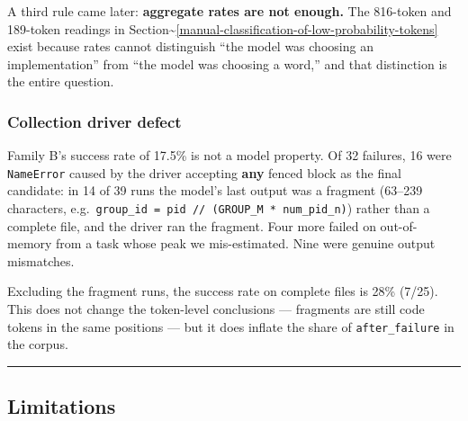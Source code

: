 \documentclass[
  11pt,
]{article}
\begin{document}
A third rule came later: \textbf{aggregate rates are not enough.} The
816-token and 189-token readings in
Section\textasciitilde{}\ref{manual-classification-of-low-probability-tokens}
exist because rates cannot distinguish ``the model was choosing an
implementation'' from ``the model was choosing a word,'' and that
distinction is the entire question.

\hypertarget{collection-driver-defect}{%
\subsubsection{Collection driver
defect}\label{collection-driver-defect}}

Family B's success rate of 17.5\% is not a model property. Of 32
failures, 16 were \texttt{NameError} caused by the driver accepting
\textbf{any} fenced block as the final candidate: in 14 of 39 runs the
model's last output was a fragment (63--239 characters,
e.g.~\texttt{group\_id\ =\ pid\ //\ (GROUP\_M\ *\ num\_pid\_n)}) rather
than a complete file, and the driver ran the fragment. Four more failed
on out-of-memory from a task whose peak we mis-estimated. Nine were
genuine output mismatches.

Excluding the fragment runs, the success rate on complete files is 28\%
(7/25). This does not change the token-level conclusions --- fragments
are still code tokens in the same positions --- but it does inflate the
share of \texttt{after\_failure} in the corpus.

\begin{center}\rule{0.5\linewidth}{0.5pt}\end{center}

\hypertarget{limitations}{%
\subsection{Limitations}\label{limitations}}
\end{document}
